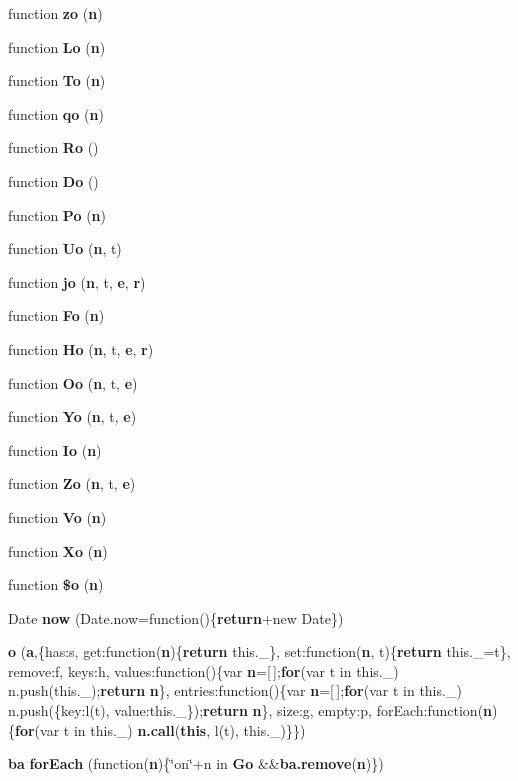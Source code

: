 \begin{DoxyCompactItemize}
function {\bf zo} ({\bf n})
\item 
function {\bf Lo} ({\bf n})
\item 
function {\bf To} ({\bf n})
\item 
function {\bf qo} ({\bf n})
\item 
function {\bf Ro} ()
\item 
function {\bf Do} ()
\item 
function {\bf Po} ({\bf n})
\item 
function {\bf Uo} ({\bf n}, t)
\item 
function {\bf jo} ({\bf n}, t, {\bf e}, {\bf r})
\item 
function {\bf Fo} ({\bf n})
\item 
function {\bf Ho} ({\bf n}, t, {\bf e}, {\bf r})
\item 
function {\bf Oo} ({\bf n}, t, {\bf e})
\item 
function {\bf Yo} ({\bf n}, t, {\bf e})
\item 
function {\bf Io} ({\bf n})
\item 
function {\bf Zo} ({\bf n}, t, {\bf e})
\item 
function {\bf Vo} ({\bf n})
\item 
function {\bf Xo} ({\bf n})
\item 
function {\bf \$o} ({\bf n})
\item 
Date {\bf now} (Date.\+now=function()\{{\bf return}+new Date\})
\item 
{\bf o} ({\bf a},\{has\+:s, get\+:function({\bf n})\{{\bf return} this.\+\_\+[{\bf c}({\bf n})]\}, set\+:function({\bf n}, t)\{{\bf return} this.\+\_\+[{\bf c}({\bf n})]=t\}, remove\+:f, keys\+:h, values\+:function()\{var {\bf n}=[$\,$];{\bf for}(var t in this.\+\_\+) n.\+push(this.\+\_\+[t]);{\bf return} {\bf n}\}, entries\+:function()\{var {\bf n}=[$\,$];{\bf for}(var t in this.\+\_\+) n.\+push(\{key\+:l(t), value\+:this.\+\_\+[t]\});{\bf return} {\bf n}\}, size\+:g, empty\+:p, for\+Each\+:function({\bf n})\{{\bf for}(var t in this.\+\_\+) {\bf n.\+call}({\bf this}, l(t), this.\+\_\+[t])\}\})
\item 
{\bf ba} {\bf for\+Each} (function({\bf n})\{\char`\"{}on\char`\"{}+n in {\bf Go} \&\&{\bf ba.\+remove}({\bf n})\})
\end{DoxyCompactItemize}
